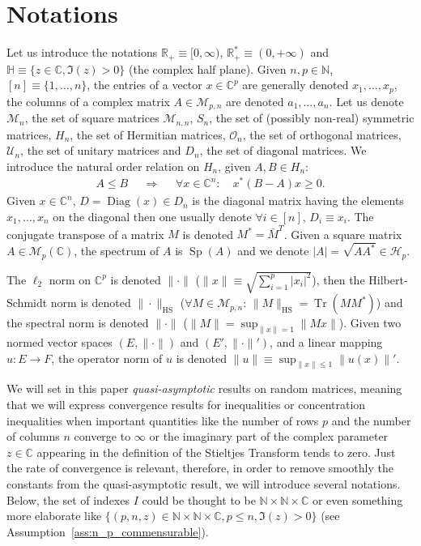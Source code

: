 \documentclass[ECP, preprint]{ejpecp} %
\DeclareMathOperator{\tr}{Tr}
\DeclareMathOperator{\diag}{Diag}
\DeclareMathOperator{\spctr}{Sp}
\DeclareMathOperator{\hs}{HS}
\begin{document}
\section{Notations}
Let us introduce the notations $\mathbb R_+\equiv [0,\infty)$, $\mathbb R_+^*\equiv (0,+\infty)$ and $\mathbb H \equiv \{z\in \mathbb C, \Im(z)>0\}$ (the complex half plane).
Given $n,p\in \mathbb N$, $[n] \equiv \{1, \ldots,  n\}$, the entries of a vector $x\in \mathbb C^p$ are generally denoted $x_1, \ldots, x_p$, the columns of a complex matrix $A\in \mathcal{M}_{p,n}$ are denoted $a_1, \ldots, a_n$. Let us denote $\mathcal{M}_{n}$, the set of square matrices $\mathcal{M}_{n,n}$, $S_n$, the set of (possibly non-real) symmetric matrices, $H_n$, the set of Hermitian matrices, $\mathcal O_n$, the set of orthogonal matrices, $\mathcal U_n$, the set of unitary matrices and $D_n$, the set of diagonal matrices. We introduce the natural order relation on $H_n$, given $A,B\in H_n$:
\begin{align*}
     A\leq B
     &&\Longrightarrow&&
     \forall x\in \mathbb C^n:\quad x^*(B-A)x\geq 0.
 \end{align*} 
 Given $x\in \mathbb C^n$, $D = \diag(x) \in D_n$ is the diagonal matrix having the elements $x_1, \ldots,x_n$ on the diagonal then one usually denote $\forall i\in [n]$, $D_i\equiv x_i$. The conjugate transpose of a matrix $M$ is denoted $M^* = \bar{M}^T$. Given a square matrix $A \in \mathcal M_{p}(\mathbb C)$, the spectrum of $A$ is $\spctr(A)$ and we denote $|A| = \sqrt{AA^*}\in \mathcal{H}_{p}$.

 The $\ell_2$ norm on $\mathbb C^p$ is denoted $\|\cdot\|$ ($\|x\| \equiv \sqrt{\sum_{i=1}^p |x_i|^2}$), then the Hilbert-Schmidt norm is denoted $\|\cdot \|_{\hs}$ ($\forall M\in \mathcal{M}_{p,n}$: $\|M\|_{\hs} = \tr(MM^*)$) and the spectral norm is denoted $\|\cdot\|$ ($\|M\| = \sup_{\|x\|=1}\|Mx\|$). Given two normed vector spaces $(E,\|\cdot \|)$ and $(E', \|\cdot \|')$, and a linear mapping $u:E\to F$, the operator norm of $u$ is denoted $\|u\| \equiv \sup_{\|x\|\leq 1}\|u(x)\|'$.



We will set in this paper \textit{quasi-asymptotic} results on random matrices, meaning that we will express convergence results for inequalities or concentration inequalities when important quantities like the number of rows $p$ and the number of columns $n$ converge to $\infty$ or the imaginary part of the complex parameter $z\in \mathbb C$ appearing in the definition of the Stieltjes Transform tends to zero. Just the rate of convergence is relevant, therefore, in order to remove smoothly the constants from the quasi-asymptotic result, we will introduce several notations. Below, the set of indexes $I$ could be thought to be $\mathbb N\times \mathbb N \times \mathbb C$ or even something more elaborate like $\{(p,n,z) \in \mathbb N\times \mathbb N \times \mathbb C, p\leq n, \Im(z)>0\}$ (see Assumption~\ref{ass:n_p_commensurable}).
\end{document}
